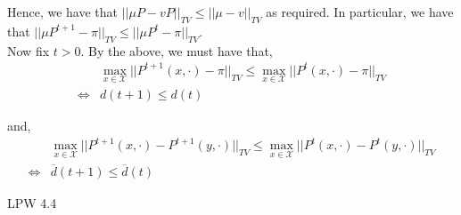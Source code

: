\documentclass[12pt]{article}
\newenvironment{problem}[2][Problem]{\begin{trivlist}
\item[\hskip \labelsep {\bfseries #1}\hskip \labelsep {\bfseries #2.}]}{\end{trivlist}}
\begin{document}
Hence, we have that $||\mu P - vP||_{TV} \leq ||\mu - v||_{TV}$ as required. In particular, we have that $||\mu P^{t+1} - \pi||_{TV} \leq ||\mu P^t - \pi||_{TV}$.\\

Now fix $t > 0$. By the above, we must have that,
\begin{align*}
&\max_{x \in \mathcal{X}} ||P^{t+1}(x, \cdot) - \pi||_{TV} \leq \max_{x \in \mathcal{X}} ||P^{t}(x, \cdot) - \pi||_{TV}\\
\iff &d(t+1) \leq d(t)
\end{align*}

and,
\begin{align*}
&\max_{x \in \mathcal{X}} ||P^{t+1}(x, \cdot) - P^{t+1}(y, \cdot)||_{TV} \leq \max_{x \in \mathcal{X}} ||P^{t}(x, \cdot) - P^{t}(y, \cdot)||_{TV}\\
\iff &\overline{d}(t+1) \leq \overline{d}(t)
\end{align*}


\begin{problem}{III}
LPW 4.4
\end{problem}
\end{document}

